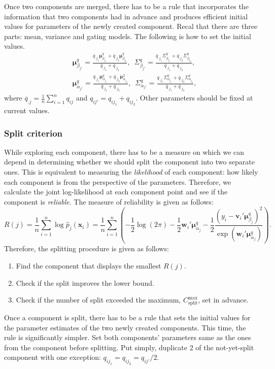 \documentclass[11pt]{article}
\newcommand{\bs}{\boldsymbol}
\begin{document}
Once two components are merged, there has to be a rule that incorporates the information that two components had in advance and produces efficient initial values for parameters of the newly created component. Recal that there are three parts: mean, variance and gating models. The following is how to set the initial values.
\begin{align*}
  &\bs{\mu}_{\beta_{j'}}^{q} = \frac{\overline{q}_{.j_{1}}\bs{\mu}_{\beta_{j_{1}}}^{q} + \overline{q}_{.j_{2}}\bs{\mu}_{\beta_{j_{2}}}^{q}}{\overline{q}_{.j_{1}} + \overline{q}_{.j_{2}}},\,\,\, \Sigma_{\beta_{j'}}^{q} = \frac{\overline{q}_{.j_{1}}\Sigma_{\beta_{j_{1}}}^{q} + \overline{q}_{.j_{2}}\Sigma_{\beta_{j_{2}}}^{q}}{\overline{q}_{.j_{1}}+\overline{q}_{.j_{2}}},\\
  &\bs{\mu}_{\alpha_{j'}}^{q} = \frac{\overline{q}_{.j_{1}}\bs{\mu}_{\alpha_{j_{1}}}^{q} + \overline{q}_{.j_{2}}\bs{\mu}_{\alpha_{j_{2}}}^{2}}{\overline{q}_{.j_{1}}+\overline{q}_{.j_{2}}}, \,\,\, \Sigma_{\alpha_{j'}}^{q} = \frac{\overline{q}_{.j_{1}}\Sigma_{\alpha_{j_{1}}}^{q} + \overline{q}_{.j_{2}}\Sigma_{\alpha_{j_{2}}}^{q}}{\overline{q}_{.j_{1}}+\overline{q}_{.j_{2}}},
\end{align*}
where $\overline{q}_{.j}=\frac{1}{n}\sum_{i=1}^{n}q_{ij}$ and $q_{ij'} = q_{ij_{1}}+q_{ij_{2}}$. Other parameters should be fixed at current values.
\subsubsection{Split criterion}
While exploring each component, there has to be a measure on which we can depend in determining whether we should split the component into two separate ones. This is equivalent to measuring the \emph{likelihood} of each component: how likely each component is from the perspective of the parameters. Therefore, we calculate the joint log-likelihood at each component point and see if the component is \emph{reliable}. The measure of reliability is given as follows:
$$
  R(j) = \frac{1}{n}\sum_{i=1}^{n}\log \hat{p}_{j}\left(\bs{x}_{i} \right) = \frac{1}{n}\sum_{i=1}^{n}\left(-\frac{1}{2}\log \left(2\pi \right) - \frac{1}{2}\bs{w}_{i}'\bs{\mu}_{\alpha_{j}}^{q}- \frac{1}{2}\frac{\left(y_{i} - \bs{v}_{i}'\bs{\mu}_{\beta_{j}}^{q} \right)^{2}}{\exp\left(\bs{w}_{i}'\bs{\mu}_{\alpha_{j}}^{q} \right)} \right).
$$
Therefore, the splitting procedure is given as follows:
\begin{enumerate}
  \item Find the component that displays the smallest $R(j)$.
  \item Check if the split improves the lower bound.
  \item Check if the number of split exceeded the maximum, $C_{\text{split}}^{\text{max}}$, set in advance.
\end{enumerate}
Once a component is split, there has to be a rule that sets the initial values for the parameter estimates of the two newly created components. This time, the rule is significantly simpler. Set both components' parameters same as the ones from the component before splitting. Put simply, duplicate 2 of the not-yet-split component with one exception: $q_{ij_{1}} = q_{ij_{2}} = q_{ij'}/2$.
\end{document}
